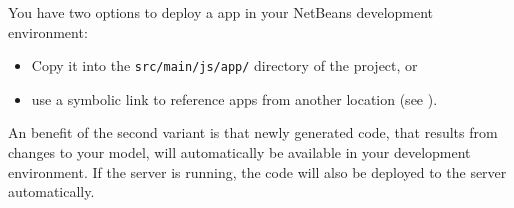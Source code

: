 \subsubsection{\mapapps} 
\label{subsubsec:mapapps}

You have two options to deploy a \mapapps app in your NetBeans development environment:
\begin{itemize}
\item Copy it into the \lstinline[language=Simple]|src/main/js/app/| directory of the project, or
\item use a symbolic link to reference apps from another location (see ).
\end{itemize} 

An benefit of the second variant is that newly generated code, that results from changes to your model, will automatically be available in your \mapapps development environment. If the server is running, the code will also be deployed to the server automatically.
